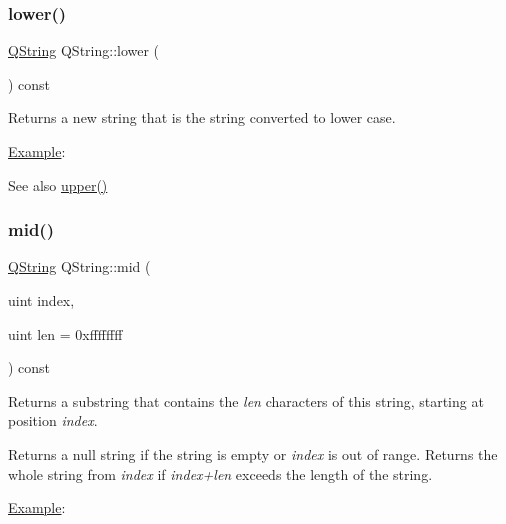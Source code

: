 \subsubsection{\texorpdfstring{lower()}{lower()}}
{\footnotesize\ttfamily \mbox{\hyperlink{class_q_string}{Q\+String}} Q\+String\+::lower (\begin{DoxyParamCaption}{ }\end{DoxyParamCaption}) const}

Returns a new string that is the string converted to lower case.

\mbox{\hyperlink{struct_example}{Example}}\+: 
\begin{DoxyCode}{0}
\end{DoxyCode}


\begin{DoxySeeAlso}{See also}
\mbox{\hyperlink{class_q_string_a4830365186780874b6e160213a422af8}{upper()}} 
\end{DoxySeeAlso}
\mbox{\label{class_q_string_a1ef65644b1885a7003d5c2a8e88df479}} 
\subsubsection{\texorpdfstring{mid()}{mid()}}
{\footnotesize\ttfamily \mbox{\hyperlink{class_q_string}{Q\+String}} Q\+String\+::mid (\begin{DoxyParamCaption}\item[{uint}]{index,  }\item[{uint}]{len = {\ttfamily 0xffffffff} }\end{DoxyParamCaption}) const}

Returns a substring that contains the {\itshape len} characters of this string, starting at position {\itshape index}.

Returns a null string if the string is empty or {\itshape index} is out of range. Returns the whole string from {\itshape index} if {\itshape index+len} exceeds the length of the string.

\mbox{\hyperlink{struct_example}{Example}}\+: 
\begin{DoxyCode}{0}
\end{DoxyCode}



